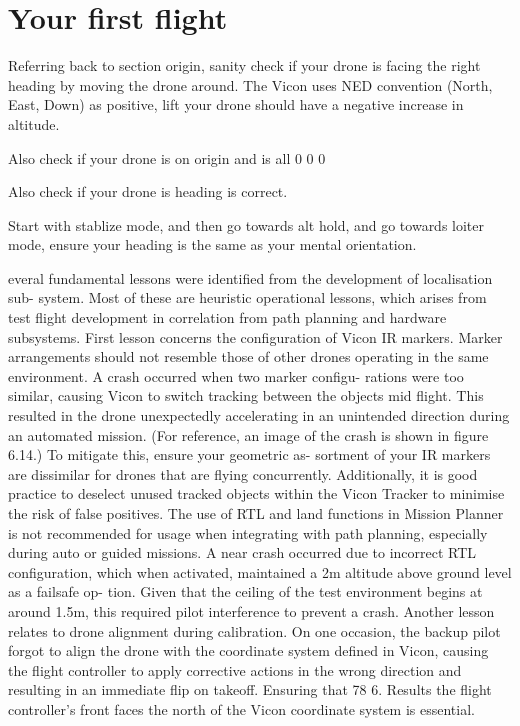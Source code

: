 \section{Your first flight}
Referring back to section origin, sanity check if your drone is facing the right heading by moving the drone around. The Vicon uses NED convention (North, East, Down) as positive, lift your drone should have a negative increase in altitude.

Also check if your drone is on origin and is all 0 0 0 

Also check if your drone is heading is correct. 

Start with stablize mode, and then go towards alt hold, and go towards loiter mode, ensure your heading is the same as your mental orientation. 

everal fundamental lessons were identified from the development of localisation sub-
system. Most of these are heuristic operational lessons, which arises from test flight development in
correlation from path planning and hardware subsystems.
First lesson concerns the configuration of Vicon IR markers. Marker arrangements should not resemble
those of other drones operating in the same environment. A crash occurred when two marker configu-
rations were too similar, causing Vicon to switch tracking between the objects mid flight. This resulted
in the drone unexpectedly accelerating in an unintended direction during an automated mission. (For
reference, an image of the crash is shown in figure 6.14.) To mitigate this, ensure your geometric as-
sortment of your IR markers are dissimilar for drones that are flying concurrently. Additionally, it is
good practice to deselect unused tracked objects within the Vicon Tracker to minimise the risk of false
positives.
The use of RTL and land functions in Mission Planner is not recommended for usage when integrating
with path planning, especially during auto or guided missions. A near crash occurred due to incorrect
RTL configuration, which when activated, maintained a 2m altitude above ground level as a failsafe op-
tion. Given that the ceiling of the test environment begins at around 1.5m, this required pilot interference
to prevent a crash.
Another lesson relates to drone alignment during calibration. On one occasion, the backup pilot forgot
to align the drone with the coordinate system defined in Vicon, causing the flight controller to apply
corrective actions in the wrong direction and resulting in an immediate flip on takeoff. Ensuring that
78 6. Results
the flight controller’s front faces the north of the Vicon coordinate system is essential.
